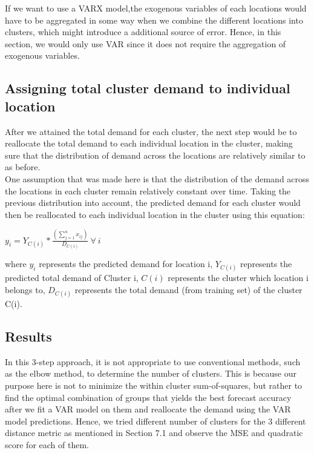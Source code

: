 \documentclass[nonblindrev,msom]{informs3} %
\begin{document}
\noindent If we want to use a VARX model,the exogenous variables of each locations would have to be aggregated in some way when we combine the different locations into clusters, which might introduce a additional source of error. Hence, in this section, we would only use VAR since it does not require the aggregation of exogenous variables.


\subsection{Assigning total cluster demand to individual location}

After we attained the total demand for each cluster, the next step would be to reallocate the total demand to each individual location in the cluster, making sure that the distribution of demand across the locations are relatively similar to as before. \\

\noindent One assumption that was made here is that the distribution of the demand across the locations in each cluster remain relatively constant over time. Taking the previous distribution into account, the predicted demand for each cluster would then be reallocated to each individual location in the cluster using this equation:

\begin{center}
    $\displaystyle y_{i} = Y_{C(i)} * \frac{(\sum_{j=1}^{n}x_{ij})}{D_{C(i)}} \: \forall \: i$
\end{center}

\noindent where $y_i$ represents the predicted demand for location i, $Y_{C(i)}$ represents the predicted total demand of Cluster i, $C(i)$ represents the cluster which location i belongs to, $D_{C(i)}$ represents the total demand (from training set) of the cluster C(i).


\subsection{Results}

In this 3-step approach, it is not appropriate to use conventional methods, such as the elbow method, to determine the number of clusters. This is because our purpose here is not to minimize the within cluster sum-of-squares, but rather to find the optimal combination of groups that yields the best forecast accuracy after we fit a VAR model on them and reallocate the demand using the VAR model predictions. Hence, we tried different number of clusters for the 3 different distance metric as mentioned in Section 7.1 and observe the MSE and quadratic score for each of them.
\end{document}
